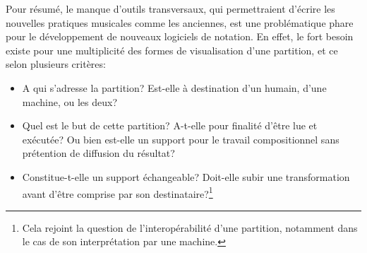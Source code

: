 Pour résumé, le manque d'outils transversaux, qui permettraient d'écrire les nouvelles pratiques musicales comme les anciennes, est une problématique phare pour le développement de nouveaux logiciels de notation.
En effet, le fort besoin existe pour une multiplicité des formes de visualisation d'une partition, et ce selon plusieurs critères:
\begin{itemize}[label=--]
	\item A qui s'adresse la partition? Est-elle à destination d'un humain, d'une machine, ou les deux?
	\item Quel est le but de cette partition? A-t-elle pour finalité d'être lue et exécutée? Ou bien est-elle un support pour le travail compositionnel sans prétention de diffusion du résultat?
	\item Constitue-t-elle un support échangeable? Doit-elle subir une transformation avant d'être comprise par son destinataire?\footnote{Cela rejoint la question de l'interopérabilité d'une partition, notamment dans le cas de son interprétation par une machine.}
	
\end{itemize}
